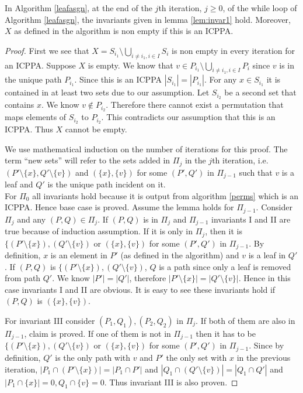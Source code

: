 \documentclass{llncs}
\begin{document}
\begin{lemma}
\label{lem:invar3}
  In Algorithm \ref{leafasgn}, at the end of the $j$th iteration, $j \geq 0$, of the while loop of
  Algorithm \ref{leafasgn}, the invariants given in lemma \ref{lem:invar1}
  hold. Moreover, $X$ as defined in the algorithm
  is non empty if this is an ICPPA.
\end{lemma}
\begin{proof}
  First we see that $X = S_{i_1} \setminus \bigcup_{i \ne i_1, i \in
    I}S_i$ is non empty in every iteration for an ICPPA. Suppose $X$
  is empty. We know that $v \in P_{i_1} \setminus \bigcup_{i \ne i_1, i \in
    I}P_i$ since $v$ is in the unique path $P_{i_1}$. Since this is an
  ICPPA $|S_{i_1}| = |P_{i_1}|$. For any $x \in S_{i_1}$ it is
  contained in at least two sets due to our assumption. Let $S_{i_2}$ be a second set that
  contains $x$. We know $v \notin P_{i_2}$. Therefore there cannot
  exist a permutation that maps elements of $S_{i_2}$ to
  $P_{i_2}$. This contradicts our assumption that this is an ICPPA. Thus $X$ cannot be empty.


  We use mathematical induction on the number of iterations for this
  proof. The term ``new sets'' will refer to the sets added in $\Pi_j$
  in the $j$th iteration, i.e. $(P' \setminus
  \{x\},Q' \setminus \{v\})$ and $(\{x\},\{v\})$ for some $(P',Q')$
  in $\Pi_{j-1}$ such that $v$ is a leaf and $Q'$ is the unique path
  incident on it.\\
  For $\Pi_0$ all invariants hold because it is output from
  algorithm \ref{perms} which is an ICPPA. Hence base case is proved.  Assume the
  lemma holds for $\Pi_{j-1}$. Consider $\Pi_j$ and any $(P,Q) \in
  \Pi_j$. If $(P,Q) $ is in $ \Pi_j$ and $\Pi_{j-1}$ invariants I and II are
  true because of induction assumption. If it is only in $\Pi_j$, then it is $\{(P' \setminus
  \{x\}),(Q' \setminus \{v\})$ or $(\{x\},\{v\})$ for some $(P',Q')$
  in $\Pi_{j-1}$. By definition, $x$ is an element in $P'$ (as defined in the
  algorithm) and $v$ is a leaf in $Q'$. If $(P,Q)$ is $\{(P' \setminus \{x\}),(Q' \setminus \{v\})$,
  $Q$ is a path since only a leaf is removed from path $Q'$. We know $|P'| = |Q'|$,
  therefore $|P' \setminus \{x\}| = |Q' \setminus \{v\}|$. Hence in this case invariants
  I and II are obvious. It is easy to see these invariants hold if $(P,Q)$ is $(\{x\},\{v\})$.


  For invariant III consider $(P_1,Q_1),(P_2,Q_2)$ in $\Pi_j$. If both
  of them are also in $\Pi_{j-1}$, claim is proved. If one of them is
  not in $\Pi_{j-1}$ then it has to be $\{(P' \setminus
  \{x\}),(Q' \setminus \{v\})$ or $(\{x\},\{v\})$ for some $(P',Q')$
  in $\Pi_{j-1}$. Since by definition, $Q'$ is the only path with $v$ and $P'$ the
  only set with $x$ in the
  previous iteration, $|P_1 \cap (P' \setminus \{x\})| = |P_1 \cap P'|$
  and $|Q_1 \cap (Q' \setminus \{v\})| = |Q_1 \cap Q'|$ and $|P_1 \cap
  \{x\}| = 0, Q_1 \cap \{v\} = 0$. Thus invariant III is also proven.


\end{proof}
\end{document}
